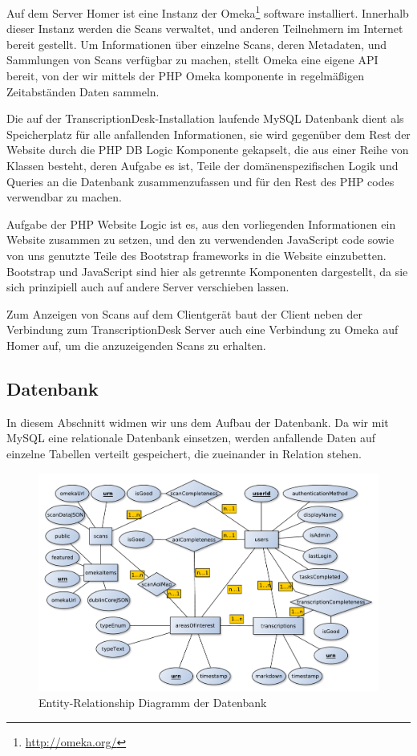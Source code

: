 \documentclass{article}
\begin{document}
Auf dem Server Homer ist eine Instanz der Omeka\footnote{\url{http://omeka.org/}} software installiert.
Innerhalb dieser Instanz werden die Scans verwaltet, und anderen Teilnehmern im Internet bereit gestellt.
Um Informationen über einzelne Scans,
deren Metadaten, und Sammlungen von Scans verfügbar zu machen,
stellt Omeka eine eigene API bereit,
von der wir mittels der PHP Omeka komponente in regelmäßigen Zeitabständen Daten sammeln.

Die auf der TranscriptionDesk-Installation laufende MySQL Datenbank dient als Speicherplatz für alle anfallenden Informationen,
sie wird gegenüber dem Rest der Website durch die PHP DB Logic Komponente gekapselt,
die aus einer Reihe von Klassen besteht, deren Aufgabe es ist,
Teile der domänenspezifischen Logik und Queries an die Datenbank zusammenzufassen
und für den Rest des PHP codes verwendbar zu machen.

Aufgabe der PHP Website Logic ist es,
aus den vorliegenden Informationen ein Website zusammen zu setzen,
und den zu verwendenden JavaScript code sowie von uns genutzte Teile des Bootstrap frameworks in die Website einzubetten.
Bootstrap und JavaScript sind hier als getrennte Komponenten dargestellt,
da sie sich prinzipiell auch auf andere Server verschieben lassen.

Zum Anzeigen von Scans auf dem Clientgerät baut der Client neben der Verbindung zum TranscriptionDesk Server auch eine Verbindung zu Omeka auf Homer auf,
um die anzuzeigenden Scans zu erhalten.

\subsection{Datenbank}
In diesem Abschnitt widmen wir uns dem Aufbau der Datenbank.
Da wir mit MySQL eine relationale Datenbank einsetzen,
werden anfallende Daten auf einzelne Tabellen verteilt gespeichert,
die zueinander in Relation stehen.

\begin{figure}[H]
\includegraphics[width=\textwidth]{../notes/ER.pdf}
\caption{Entity-Relationship Diagramm der Datenbank}
\label{fig:er}
\end{figure}
\end{document}
